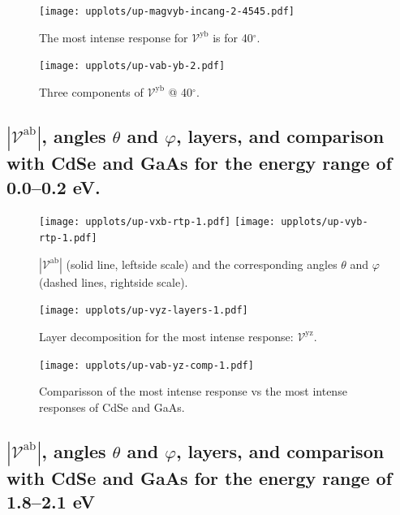 \documentclass{article}
\let\Oldsubsection\subsection
\renewcommand{\subsection}{\FloatBarrier\Oldsubsection}
\begin{document}
\begin{figure}[ht]
    \centering
    \texttt{[image: upplots/up-magvyb-incang-2-4545.pdf]}
    \caption{The most intense response for $\mathcal{V}^{\mathrm{yb}} $ is for 
    40$^{\circ}$.}
    \label{fig:up-magybincang2}
\end{figure}
\begin{figure}[ht]
    \centering
    \texttt{[image: upplots/up-vab-yb-2.pdf]}
    \caption{Three components of $\mathcal{V}^{\mathrm{yb}} $ @ 40$^{\circ}$.}
    \label{fig:upvyb2}
\end{figure}

\clearpage

\subsection{$|\mathcal{V}^{\mathrm{ab}}|$, angles
$\theta$ and $\varphi$, layers, and comparison with CdSe and GaAs for the energy
range of 0.0--0.2 eV.}

\begin{figure}[ht]
    \centering
    \texttt{[image: upplots/up-vxb-rtp-1.pdf]}
    \texttt{[image: upplots/up-vyb-rtp-1.pdf]}
    \caption{$|\mathcal{V}^{\mathrm{ab}}|$ (solid line, leftside scale) and the
    corresponding angles $\theta$ and $\varphi$ (dashed lines, rightside scale).}
    \label{fig:up-rtp1}
\end{figure}

\begin{figure}[ht]
    \centering
    \texttt{[image: upplots/up-vyz-layers-1.pdf]}
    \caption{Layer decomposition for the most intense response:
    $\mathcal{V}^{\mathrm{yz}}$.}
    \label{fig:up-lay1}
\end{figure}

\begin{figure}[ht]
    \centering
    \texttt{[image: upplots/up-vab-yz-comp-1.pdf]}
    \caption{Comparisson of the most intense response vs the most intense
    responses of CdSe and GaAs.}
    \label{fig:up-comp1}
\end{figure}

\subsection{$|\mathcal{V}^{\mathrm{ab}}|$, angles
$\theta$ and $\varphi$, layers, and comparison with CdSe and GaAs for the energy
range of 1.8--2.1 eV}
\end{document}
